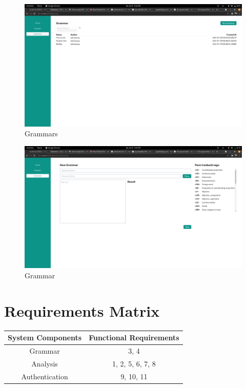\begin{figure}[H]
    \includegraphics[width=15cm]{images/Grammars.png}
    \caption{Grammars}
\end{figure}

\begin{figure}[H]
    \includegraphics[width=15cm]{images/Grammar.png}
    \caption{Grammar}
\end{figure}


\section{Requirements Matrix}
\begin{center}
    \begin{tabular}{|c|c|}
        \hline
        System Components & Functional Requirements \\
        \hline\hline
        Grammar           & 3, 4                    \\
        \hline
        Analysis          & 1, 2, 5, 6, 7, 8        \\
        \hline
        Authentication    & 9, 10, 11               \\
        \hline
    \end{tabular}
\end{center}
